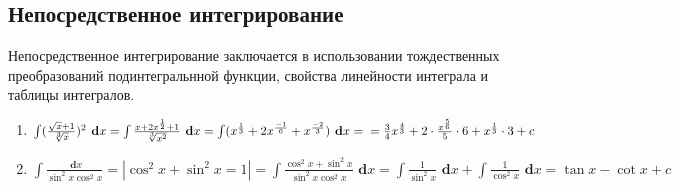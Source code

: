 \documentclass[a4paper,12pt, centered]{bookest}
\theoremstyle{remark}
\newcommand\dx{\textbf{ d}x}
\begin{document}
\subsection{Непосредственное интегрирование}
Непосредственное интегрирование заключается в использовании тождественных преобразований подинтегральнной функции, свойства линейности интеграла и таблицы интегралов.\\
\begin{example}
\begin{enumerate}
	\item $\int(\frac{\sqrt{x}+1}{\sqrt[3]{x}})^2\dx=\int\frac{x+2x^{\frac{1}{2}}+1}{\sqrt[3]{x^2}}\dx=\int(x^{\frac{1}{3}}+2x^{\frac{-1}{6}}+x^{\frac{-2}{3}})\dx=\\=\frac{3}{4}x^{\frac{4}{3}}+2\cdot\frac{x^{\frac{5}{6}}}{5}\cdot 6+x^{\frac{1}{3}}\cdot 3+c$
	\item $\int\frac{\dx}{\sin^2x\cos^2x}=|\cos^2x+\sin^2x=1|=\int\frac{\cos^2x+\sin^2x}{\sin^2x\cos^2x}\dx=\int\frac{1}{\sin^2x}\dx+\int\frac{1}{\cos^2x}\dx=\tan x-\cot x+c$
\end{enumerate}
\end{example}
\end{document}
